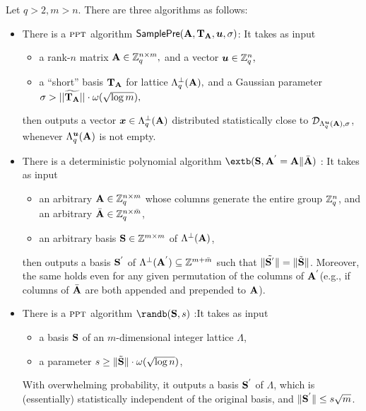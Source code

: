 \begin{lemma} \label{lem:samp}
Let $q>2, m>n.$ There are three algorithms as follows:
\begin{itemize}
 \item There is a $\textsc{ppt}$  algorithm $\mathsf{SamplePre}(\mathbf{A}, \mathbf{T}_{\mathbf{A}}, \boldsymbol{u}, \sigma)$: It takes as input
\begin{itemize}
\item a rank-$n$ matrix $\mathbf{A}\in\mathbb{Z}_q^{n\times m},$ and a vector $\boldsymbol{u}\in\mathbb{Z}_q^n,$
\item a ``short'' basis $\mathbf{T}_{\mathbf{A}}$ for lattice $\Lambda_q^{\bot}(\mathbf{A}),$ and a Gaussian parameter $\sigma > ||\widetilde{\mathbf{T}_{\mathbf{A}}}||\cdot\omega(\sqrt{\log m}),$
\end{itemize}
then outputs a vector $\boldsymbol{x} \in \Lambda^{\perp}_{q}(\mathbf{A})$ distributed statistically close to $\mathcal{D}_{\Lambda^{\boldsymbol{u}}_{q}(\mathbf{A}),\sigma}$, whenever $\Lambda^{\boldsymbol{u}}_{q}(\mathbf{A})$ is not empty.



 \item There is a deterministic polynomial algorithm $\extb(\mat{S}, \mat{A}^{'}=\mat{A}\| \bar{\mat{A}})$ : It takes as input
\begin{itemize}
\item an arbitrary $\mathbf{A} \in \mathbb{Z}^{n \times m}_{q}$ whose columns generate the entire group $\mathbb{Z}^{n}_{q}$, and an arbitrary $\bar{\mathbf{A}} \in \mathbb{Z}^{n \times \bar{m}}_{q}$,
\item an arbitrary basis $\mathbf{S} \in \mathbb{Z}^{m \times m}$ of $\Lambda^{\bot}(\mathbf{A})$,
\end{itemize}
then outputs a basis $\mathbf{S}^{'}$ of $\Lambda^{\bot}(\mathbf{A}^{'}) \subseteq \mathbb{Z}^{m+\bar{m}}$ such that $\|\tilde{\mathbf{S}^{'}}\|=\|\tilde{\mathbf{S}}\|$. Moreover, the same holds even for any given permutation of the columns of $\mathbf{A}^{'}$(e.g., if columns of $\bar{\mathbf{A}}$ are both appended and prepended to $\mathbf{A}$).


 \item There is a $\textsc{ppt}$ algorithm $\randb(\mat{S}, s)$ :It takes as input
\begin{itemize}
\item a basis $\mathbf{S}$ of an $m$-dimensional integer lattice $\Lambda$,
\item a parameter $s\geq \| \tilde{\mathbf{S}} \| \cdot \omega(\sqrt{\log n})$,
\end{itemize}
With overwhelming probability, it outputs a basis $\mathbf{S}^{'}$ of $\Lambda$, which is (essentially) statistically independent of the original basis, and $\| \mathbf{S}^{'} \|\leq s\sqrt{m}$.






\end{itemize}
\end{lemma}
